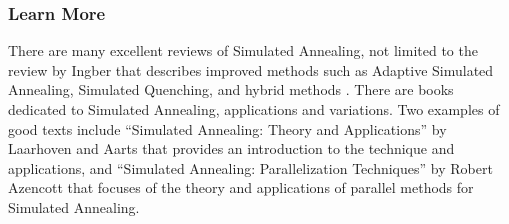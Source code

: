 % 
% 
\subsubsection{Learn More}
There are many excellent reviews of Simulated Annealing, not limited to the review by Ingber that describes improved methods such as Adaptive Simulated Annealing, Simulated Quenching, and hybrid methods \cite{Ingber1993}.
There are books dedicated to Simulated Annealing, applications and variations. Two examples of good texts include ``Simulated Annealing: Theory and Applications'' by Laarhoven and Aarts \cite{Laarhoven1988} that provides an introduction to the technique and applications, and ``Simulated Annealing: Parallelization Techniques'' by Robert Azencott \cite{Azencott1992} that focuses of the theory and applications of parallel methods for Simulated Annealing.


